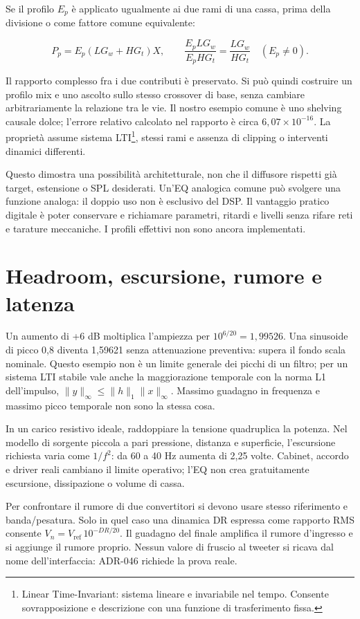 \documentclass[
  italian,
  11pt,
  a4paper,
]{article}
\begin{document}
Se il profilo \(E_p\) è applicato ugualmente ai due rami di una cassa, prima della divisione
o come fattore comune equivalente:

\[P_p=E_p(LG_w+HG_t)X,\qquad\frac{E_pLG_w}{E_pHG_t}=\frac{LG_w}{HG_t}\quad(E_p\ne0).\]

Il rapporto complesso fra i due contributi è preservato. Si può quindi costruire un profilo
mix e uno ascolto sullo stesso crossover di base, senza cambiare arbitrariamente la
relazione tra le vie. Il nostro esempio comune è uno shelving causale dolce; l'errore
relativo calcolato nel rapporto è circa \(6{,}07\times10^{-16}\). La proprietà assume
sistema LTI\footnote{Linear Time-Invariant: sistema lineare e invariabile nel tempo.
  Consente sovrapposizione e descrizione con una funzione di trasferimento fissa.}, stessi
rami e assenza di clipping o interventi dinamici differenti.

Questo dimostra una possibilità architetturale, non che il diffusore rispetti già target,
estensione o SPL desiderati. Un'EQ analogica comune può svolgere una funzione analoga: il
doppio uso non è esclusivo del DSP. Il vantaggio pratico digitale è poter conservare e
richiamare parametri, ritardi e livelli senza rifare reti e tarature meccaniche. I profili
effettivi non sono ancora implementati.

\section{Headroom, escursione, rumore e latenza}\label{headroom-escursione-rumore-e-latenza}

Un aumento di +6 dB moltiplica l'ampiezza per \(10^{6/20}=1{,}99526\). Una sinusoide di
picco 0,8 diventa 1,59621 senza attenuazione preventiva: supera il fondo scala nominale.
Questo esempio non è un limite generale dei picchi di un filtro; per un sistema LTI stabile
vale anche la maggiorazione temporale con la norma L1 dell'impulso,
\(\lVert y\rVert_\infty \le \lVert h\rVert_1\lVert x\rVert_\infty\). Massimo guadagno in
frequenza e massimo picco temporale non sono la stessa cosa.

In un carico resistivo ideale, raddoppiare la tensione quadruplica la potenza. Nel modello
di sorgente piccola a pari pressione, distanza e superficie, l'escursione richiesta varia
come \(1/f^2\): da 60 a 40 Hz aumenta di 2,25 volte. Cabinet, accordo e driver reali
cambiano il limite operativo; l'EQ non crea gratuitamente escursione, dissipazione o volume
di cassa.

Per confrontare il rumore di due convertitori si devono usare stesso riferimento e
banda/pesatura. Solo in quel caso una dinamica DR espressa come rapporto RMS consente
\(V_n=V_\mathrm{ref}\,10^{-DR/20}\). Il guadagno del finale amplifica il rumore d'ingresso e
si aggiunge il rumore proprio. Nessun valore di fruscio al tweeter si ricava dal nome
dell'interfaccia: ADR-046 richiede la prova reale.
\end{document}
